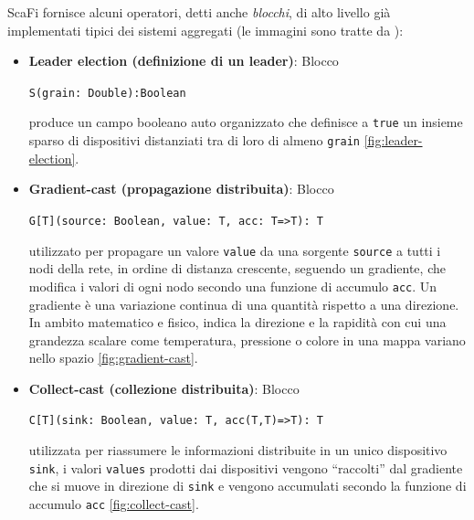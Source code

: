 \documentclass[12pt,a4paper,openright,twoside]{book}
\begin{document}
ScaFi fornisce alcuni operatori, detti anche \textit{blocchi}, di alto livello già implementati tipici dei sistemi aggregati \cite{Casadei2022} (le immagini sono tratte da \cite{CasadeiPhDThesis}):

\begin{itemize}
    \item \textbf{Leader election (definizione di un leader)}: Blocco 
    \begin{center}
        \verb|S(grain: Double):Boolean|
    \end{center}
    produce un campo booleano auto organizzato che definisce a \verb|true| un insieme sparso di dispositivi distanziati tra di loro di almeno \verb|grain| \cref{fig:leader-election}.
    \item \textbf{Gradient-cast (propagazione distribuita)}: Blocco 
    \begin{center}
        \verb|G[T](source: Boolean, value: T, acc: T=>T): T|
    \end{center}
    utilizzato per propagare un valore \verb|value| da una sorgente \verb|source| a tutti i nodi della rete, in ordine di distanza crescente, seguendo un gradiente, che modifica i valori di ogni nodo secondo una funzione di accumulo \verb|acc|. Un gradiente è una variazione continua di una quantità rispetto a una direzione. In ambito matematico e fisico, indica la direzione e la rapidità con cui una grandezza scalare come temperatura, pressione o colore in una mappa variano nello spazio \cref{fig:gradient-cast}.
    \item \textbf{Collect-cast (collezione distribuita)}: Blocco 
    \begin{center}
        \verb|C[T](sink: Boolean, value: T, acc(T,T)=>T): T| 
    \end{center}
    utilizzata per riassumere le informazioni distribuite in un unico dispositivo \verb|sink|, i valori \verb|values| prodotti dai dispositivi vengono ``raccolti'' dal gradiente che si muove in direzione di \verb|sink| e vengono accumulati secondo la funzione di accumulo \verb|acc| \cref{fig:collect-cast}.
\end{itemize}
\end{document}
